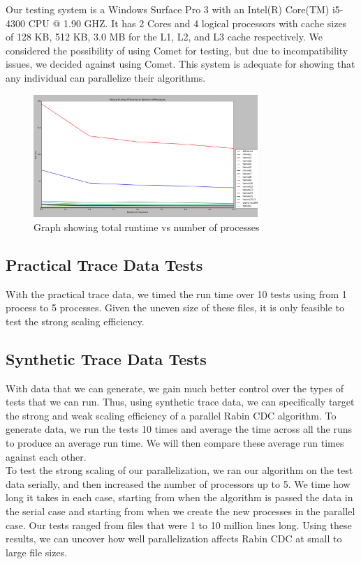 \documentclass{acmtog} %
\begin{document}
	Our testing system is a Windows Surface Pro 3 with an Intel(R) Core(TM) i5-4300 CPU @ 1.90 GHZ. It has 2 Cores and 4 logical processors with cache sizes of 128 KB, 512 KB, 3.0 MB for the L1, L2, and L3 cache respectively. We considered the possibility of using Comet for testing, but due to incompatibility issues, we decided against using Comet. This system is adequate for showing that any individual can parallelize their algorithms. 

	
	
		\begin{figure}
			\centerline{\includegraphics[width=8.5cm]{img/AllTimesvsProcess}}
			\caption{Graph showing total runtime vs number of processes}
			\label{fig:runtimecomparisons}
		\end{figure}
	\subsection{Practical Trace Data Tests}

	With the practical trace data, we timed the run time over 10 tests using from 1 process to 5 processes. Given the uneven size of these files, it is only feasible to test the strong scaling efficiency.
	\subsection{Synthetic Trace Data Tests}
	With data that we can generate, we gain much better control over the types of tests that we can run. Thus, using synthetic trace data, we can specifically target the strong and weak scaling efficiency of a parallel Rabin CDC algorithm. To generate data, we run the tests 10 times and average the time across all the runs to produce an average run time. We will then compare these average run times against each other. \\
	
	To test the strong scaling of our parallelization, we ran our algorithm on the test data serially, and then increased the number of processors up to 5. We time how long it takes in each case, starting from when the algorithm is passed the data in the serial case and starting from when we create the new processes in the parallel case. Our tests ranged from files that were 1 to 10 million lines long. Using these results, we can uncover how well parallelization affects Rabin CDC at small to large file sizes.\\
	
\end{document}
